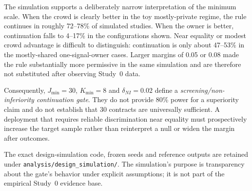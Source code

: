 The simulation supports a deliberately narrow interpretation of the minimum scale. When the crowd is clearly better in the toy mostly-private regime, the rule continues in roughly 72--78\% of simulated studies. When the owner is better, continuation falls to 4--17\% in the configurations shown. Near equality or modest crowd advantage is difficult to distinguish: continuation is only about 47--53\% in the mostly-shared one-signal-owner cases. Larger margins of 0.05 or 0.08 made the rule substantially more permissive in the same simulation and are therefore not substituted after observing Study~0 data.

Consequently, $J_{\min}=30$, $K_{\min}=8$ and $\delta_{NI}=0.02$ define a \emph{screening/non-inferiority continuation gate}. They do not provide 80\% power for a superiority claim and do not establish that 30 contracts are universally sufficient. A deployment that requires reliable discrimination near equality must prospectively increase the target sample rather than reinterpret a null or widen the margin after outcomes.

The exact design-simulation code, frozen seeds and reference outputs are retained under \texttt{analysis/design\_simulation/}. The simulation's purpose is transparency about the gate's behavior under explicit assumptions; it is not part of the empirical Study~0 evidence base.
